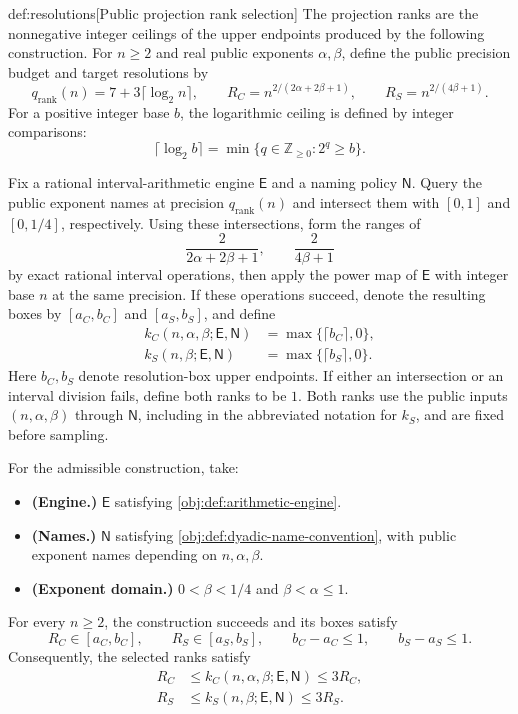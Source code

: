 \begin{algorithmv}{def:resolutions}[Public projection rank selection]
The projection ranks are the nonnegative integer ceilings of the upper endpoints produced by the following construction. For \(n\ge2\) and real public exponents \(\alpha,\beta\), define the public precision budget and target resolutions by
\[
q_{\mathrm{rank}}(n)=7+3\lceil\log_2 n\rceil,\qquad
R_C=n^{2/(2\alpha+2\beta+1)},\qquad
R_S=n^{2/(4\beta+1)}.
\]
For a positive integer base \(b\), the logarithmic ceiling is defined by integer comparisons:
\[
\lceil\log_2 b\rceil
=\min\{q\in\mathbb Z_{\ge0}:2^q\ge b\}.
\]

Fix a rational interval-arithmetic engine \(\mathsf E\) and a naming policy \(\mathsf N\). Query the public exponent names at precision \(q_{\mathrm{rank}}(n)\) and intersect them with \([0,1]\) and \([0,1/4]\), respectively. Using these intersections, form the ranges of
\[
\frac{2}{2\alpha+2\beta+1},
\qquad
\frac{2}{4\beta+1}
\]
by exact rational interval operations, then apply the power map of \(\mathsf E\) with integer base \(n\) at the same precision. If these operations succeed, denote the resulting boxes by \([a_C,b_C]\) and \([a_S,b_S]\), and define
\[
\begin{aligned}
k_C(n,\alpha,\beta;\mathsf E,\mathsf N)
&=\max\{\lceil b_C\rceil,0\},\\
k_S(n,\beta;\mathsf E,\mathsf N)
&=\max\{\lceil b_S\rceil,0\}.
\end{aligned}
\]
Here \(b_C,b_S\) denote resolution-box upper endpoints. If either an intersection or an interval division fails, define both ranks to be \(1\). Both ranks use the public inputs \((n,\alpha,\beta)\) through \(\mathsf N\), including in the abbreviated notation for \(k_S\), and are fixed before sampling.

For the admissible construction, take:
\begin{itemize}
\item \textbf{(Engine.)} \(\mathsf E\) satisfying \cref{obj:def:arithmetic-engine}.
\item \textbf{(Names.)} \(\mathsf N\) satisfying \cref{obj:def:dyadic-name-convention}, with public exponent names depending on \(n,\alpha,\beta\).
\item \textbf{(Exponent domain.)} \(0<\beta<1/4\) and \(\beta<\alpha\le1\).
\end{itemize}
For every \(n\ge2\), the construction succeeds and its boxes satisfy
\[
R_C\in[a_C,b_C],\qquad R_S\in[a_S,b_S],
\qquad b_C-a_C\le1,\qquad b_S-a_S\le1.
\]
Consequently, the selected ranks satisfy
\[
\begin{aligned}
R_C&\le k_C(n,\alpha,\beta;\mathsf E,\mathsf N)\le3R_C,\\
R_S&\le k_S(n,\beta;\mathsf E,\mathsf N)\le3R_S.
\end{aligned}
\]
\end{algorithmv}

